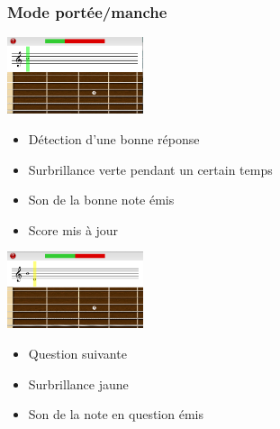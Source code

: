 \documentclass{beamer}
\begin{document}
		\begin{frame}
		 \frametitle{Mode portée/manche}
                         
                         \begin{minipage}{0.35\linewidth}
                                 \includegraphics[width=4cm]{images/portee_good_answer.png}
                         \end{minipage}\hfill
                         \begin{minipage}{0.6\linewidth}
 
                                 \begin{itemize}
                                         \item Détection d'une bonne réponse
                                         \item Surbrillance verte pendant un certain temps
                                         \item Son de la bonne note émis
                                         \item Score mis à jour
                                 \end{itemize}
                         \end{minipage}
                         \bigbreak
			\pause
                         \begin{minipage}{0.35\linewidth}
                                 \includegraphics[width=4cm]{images/portee_question2.png}
                         \end{minipage}\hfill
                         \begin{minipage}{0.6\linewidth}
 
                                 \begin{itemize}
                                         \item Question suivante
                                         \item Surbrillance jaune
                                         \item Son de la note en question émis
                                 \end{itemize}
                         \end{minipage}
                 \end{frame}
\end{document}
